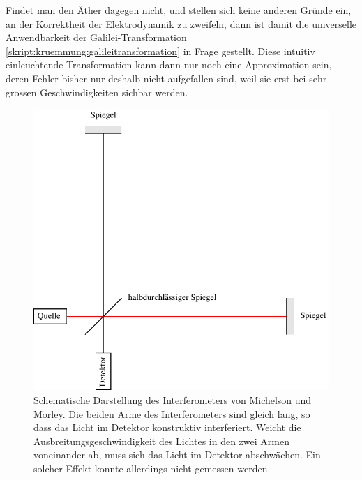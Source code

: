 Findet man den Äther dagegen nicht, und stellen sich keine anderen Gründe
ein, an der Korrektheit der Elektrodynamik zu zweifeln, dann ist damit
die universelle Anwendbarkeit der Galilei-Transformation 
\eqref{skript:kruemmung:galileitransformation} in Frage gestellt.
Diese intuitiv einleuchtende Transformation kann dann nur noch eine
Approximation sein, deren Fehler bisher nur deshalb nicht aufgefallen
sind, weil sie erst bei sehr grossen Geschwindigkeiten sichbar werden.

\begin{figure}
\centering
\includegraphics{chapters/tikz/interferometer.pdf}
\caption{Schematische Darstellung des Interferometers von Michelson und Morley.
Die beiden Arme des Interferometers sind gleich lang, so dass das Licht
im Detektor konstruktiv interferiert.
Weicht die Ausbreitungsgeschwindigkeit des Lichtes in den zwei Armen
voneinander ab, muss sich das Licht im Detektor abschwächen.
Ein solcher Effekt konnte allerdings nicht gemessen werden.
\label{skript:speziell:interferometerprinzip}}
\end{figure}

